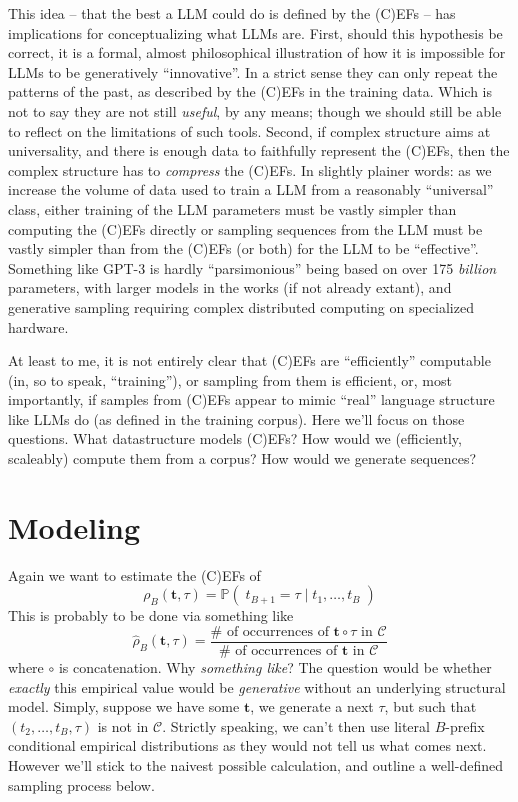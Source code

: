 \documentclass[11pt, oneside]{amsart}   	%
\begin{document}
This idea -- that the best a LLM could do is defined by the (C)EFs -- has implications for conceptualizing what LLMs are. First, should this hypothesis be correct, it is a formal, almost philosophical illustration of how it is impossible for LLMs to be generatively ``innovative''. In a strict sense they can only repeat the patterns of the past, as described by the (C)EFs in the training data. Which is not to say they are not still {\em useful}, by any means; though we should still be able to reflect on the limitations of such tools. Second, if complex structure aims at universality, and there is enough data to faithfully represent the (C)EFs, then the complex structure has to {\em compress} the (C)EFs. In slightly plainer words: as we increase the volume of data used to train a LLM from a reasonably ``universal''  class, either training of the LLM parameters must be vastly simpler than computing the (C)EFs directly or sampling sequences from the LLM must be vastly simpler than from the (C)EFs (or both) for the LLM to be ``effective''. Something like GPT-3 is hardly ``parsimonious'' being based on over 175 {\em billion} parameters, with larger models in the works (if not already extant), and generative sampling requiring complex distributed computing on specialized hardware. 

At least to me, it is not entirely clear that (C)EFs are ``efficiently'' computable (in, so to speak, ``training''), or sampling from them is efficient, or, most importantly, if samples from (C)EFs appear to mimic ``real'' language structure like LLMs do (as defined in the training corpus). Here we'll focus on those questions. What datastructure models (C)EFs? How would we (efficiently, scaleably) compute them from a corpus? How would we generate sequences? 

\section{Modeling}

Again we want to estimate the (C)EFs of
\begin{equation*}
	\rho_B(\mathbf{t}, \tau) = \mathbb{P}(\; t_{B+1} = \tau \; | \; t_1, \dotsc , t_B \; )
\end{equation*}
This is probably to be done via something like
\begin{equation*}
	\hat{\rho}_B(\mathbf{t},\tau) 
		= \frac{ \#\text{ of occurrences of }\mathbf{t} \circ \tau\text{ in }\mathcal{C} }
			{ \#\text{ of occurrences of }\mathbf{t}\text{ in }\mathcal{C} }
\end{equation*}
where $\circ$ is concatenation. Why {\em something like}? The question would be whether {\em exactly} this empirical value would be {\em generative} without an underlying structural model. Simply, suppose we have some $\mathbf{t}$, we generate a next $\tau$, but such that $(t_2,\dotsc,t_B,\tau)$ is not in $\mathcal{C}$. Strictly speaking, we can't then use literal $B$-prefix conditional empirical distributions as they would not tell us what comes next. However we'll stick to the naivest possible calculation, and outline a well-defined sampling process below. 
\end{document}
